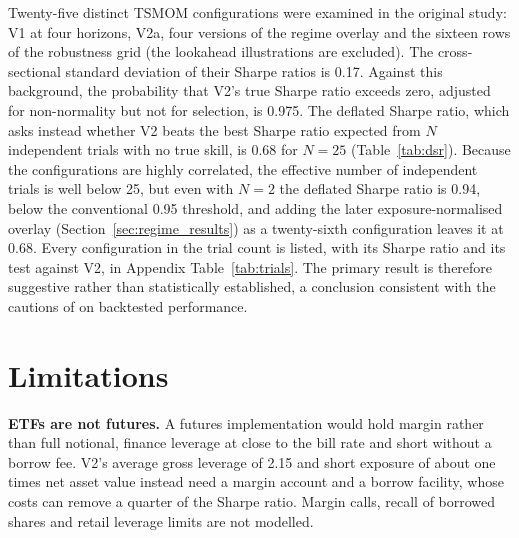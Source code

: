 \documentclass[11pt,a4paper]{article}
\begin{document}
Twenty-five distinct TSMOM configurations were examined in the original study: V1 at four horizons, V2a, four versions of the regime overlay and the sixteen rows of the robustness grid (the lookahead illustrations are excluded). The cross-sectional standard deviation of their Sharpe ratios is 0.17. Against this background, the probability that V2's true Sharpe ratio exceeds zero, adjusted for non-normality but not for selection, is 0.975. The deflated Sharpe ratio, which asks instead whether V2 beats the best Sharpe ratio expected from $N$ independent trials with no true skill, is 0.68 for $N = 25$ (Table~\ref{tab:dsr}). Because the configurations are highly correlated, the effective number of independent trials is well below 25, but even with $N = 2$ the deflated Sharpe ratio is 0.94, below the conventional 0.95 threshold, and adding the later exposure-normalised overlay (Section~\ref{sec:regime_results}) as a twenty-sixth configuration leaves it at 0.68. Every configuration in the trial count is listed, with its Sharpe ratio and its test against V2, in Appendix Table~\ref{tab:trials}. The primary result is therefore suggestive rather than statistically established, a conclusion consistent with the cautions of \citet{harvey2016} on backtested performance.

\begin{table}[!htbp]
\centering
\caption{Deflated Sharpe ratio of V2 \citep{bailey2014}. SR$_0$ is the expected maximum annual Sharpe ratio of $N$ independent zero-skill trials, given the observed cross-trial dispersion (0.17); DSR is the probability that V2's true Sharpe ratio exceeds SR$_0$, adjusted for the skewness and kurtosis of its monthly returns. Rows up to $N = 25$ use the dispersion of the original 25 configurations; the $N = 26$ row adds the exposure-normalised overlay to the trial set.}
\label{tab:dsr}
\small

\end{table}

\FloatBarrier
\section{Limitations}
\label{sec:limitations}

\textbf{ETFs are not futures.} A futures implementation would hold margin rather than full notional, finance leverage at close to the bill rate and short without a borrow fee. V2's average gross leverage of 2.15 and short exposure of about one times net asset value instead need a margin account and a borrow facility, whose costs can remove a quarter of the Sharpe ratio. Margin calls, recall of borrowed shares and retail leverage limits are not modelled.
\end{document}
